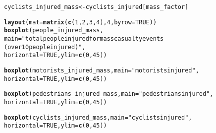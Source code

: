 \documentclass[10pt]{article}\usepackage[]{graphicx}\usepackage[]{xcolor}
\makeatletter
\newcommand{\hlnum}[1]{\textcolor[rgb]{0.686,0.059,0.569}{#1}}%
\newcommand{\hlsng}[1]{\textcolor[rgb]{0.192,0.494,0.8}{#1}}%
\newcommand{\hldef}[1]{\textcolor[rgb]{0.345,0.345,0.345}{#1}}%
\newcommand{\hlkwb}[1]{\textcolor[rgb]{0.69,0.353,0.396}{#1}}%
\newcommand{\hlkwc}[1]{\textcolor[rgb]{0.333,0.667,0.333}{#1}}%
\newcommand{\hlkwd}[1]{\textcolor[rgb]{0.737,0.353,0.396}{\textbf{#1}}}%
\newenvironment{kframe}{%
 \def\at@end@of@kframe{}%
 \ifinner\ifhmode%
  \def\at@end@of@kframe{\end{minipage}}%
  \begin{minipage}{\columnwidth}%
 \fi\fi%
 \def\FrameCommand##1{\hskip\@totalleftmargin \hskip-\fboxsep
 \colorbox{shadecolor}{##1}\hskip-\fboxsep
     \hskip-\linewidth \hskip-\@totalleftmargin \hskip\columnwidth}%
 \MakeFramed {\advance\hsize-\width
   \@totalleftmargin\z@ \linewidth\hsize
   \@setminipage}}%
 {\par\unskip\endMakeFramed%
 \at@end@of@kframe}
\newenvironment{knitrout}{}{} %
\makeatother
\begin{document}
\begin{knitrout}
\begin{kframe}
{\ttfamily\noindent\bfseries\color{errorcolor}{\#\# Error: object 'pedestrians\_injured' not found}}\begin{alltt}
\hldef{cyclists_injured_mass} \hlkwb{<-} \hldef{cyclists_injured[mass_factor]}
\end{alltt}


{\ttfamily\noindent\bfseries\color{errorcolor}{\#\# Error: object 'cyclists\_injured' not found}}\begin{alltt}
\hlkwd{layout}\hldef{(}\hlkwc{mat} \hldef{=} \hlkwd{matrix}\hldef{(}\hlkwd{c}\hldef{(}\hlnum{1}\hldef{,} \hlnum{2}\hldef{,} \hlnum{3}\hldef{,} \hlnum{4}\hldef{),} \hlnum{4}\hldef{,} \hlkwc{byrow} \hldef{=} \hlnum{TRUE}\hldef{))}
\hlkwd{boxplot}\hldef{(people_injured_mass,}
        \hlkwc{main}\hldef{=}\hlsng{"total people injured for mass casualty events 
        (over 10 people injured)"}\hldef{,}
        \hlkwc{horizontal}\hldef{=}\hlnum{TRUE}\hldef{,} \hlkwc{ylim} \hldef{=} \hlkwd{c}\hldef{(}\hlnum{0}\hldef{,} \hlnum{45}\hldef{))}
\end{alltt}


{\ttfamily\noindent\bfseries\color{errorcolor}{\#\# Error: object 'people\_injured\_mass' not found}}\begin{alltt}
\hlkwd{boxplot}\hldef{(motorists_injured_mass,} \hlkwc{main}\hldef{=}\hlsng{"motorists injured"}\hldef{,}
        \hlkwc{horizontal}\hldef{=}\hlnum{TRUE}\hldef{,} \hlkwc{ylim} \hldef{=} \hlkwd{c}\hldef{(}\hlnum{0}\hldef{,} \hlnum{45}\hldef{))}
\end{alltt}


{\ttfamily\noindent\bfseries\color{errorcolor}{\#\# Error: object 'motorists\_injured\_mass' not found}}\begin{alltt}
\hlkwd{boxplot}\hldef{(pedestrians_injured_mass,} \hlkwc{main}\hldef{=}\hlsng{"pedestrians injured"}\hldef{,}
        \hlkwc{horizontal}\hldef{=}\hlnum{TRUE}\hldef{,} \hlkwc{ylim} \hldef{=} \hlkwd{c}\hldef{(}\hlnum{0}\hldef{,} \hlnum{45}\hldef{))}
\end{alltt}


{\ttfamily\noindent\bfseries\color{errorcolor}{\#\# Error: object 'pedestrians\_injured\_mass' not found}}\begin{alltt}
\hlkwd{boxplot}\hldef{(cyclists_injured_mass,} \hlkwc{main} \hldef{=} \hlsng{"cyclists injured"}\hldef{,}
        \hlkwc{horizontal}\hldef{=}\hlnum{TRUE}\hldef{,} \hlkwc{ylim} \hldef{=} \hlkwd{c}\hldef{(}\hlnum{0}\hldef{,} \hlnum{45}\hldef{))}
\end{alltt}


{\ttfamily\noindent\bfseries\color{errorcolor}{\#\# Error: object 'cyclists\_injured\_mass' not found}}\end{kframe}
\end{knitrout}
\end{document}
